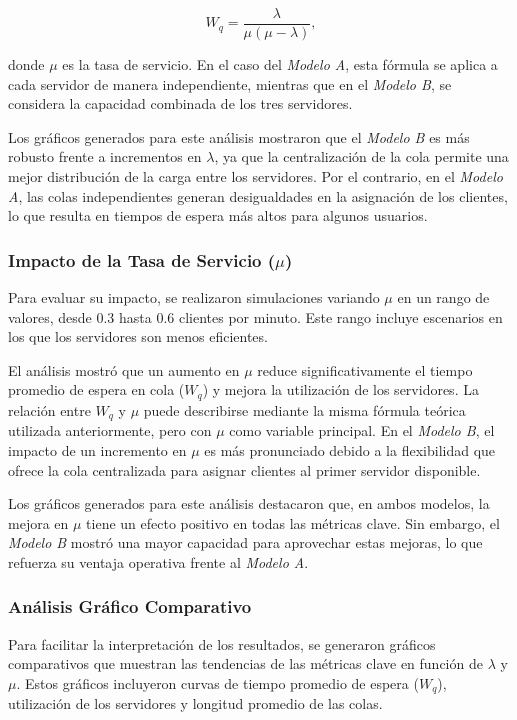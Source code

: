 \documentclass[a4paper,12pt]{article}
\begin{document}
\[\
W_q = \frac{\lambda}{\mu (\mu - \lambda)},
\]

donde \( \mu \) es la tasa de servicio. En el caso del \textit{Modelo A}, esta fórmula se aplica a cada servidor de manera independiente, mientras que en el \textit{Modelo B}, se considera la capacidad combinada de los tres servidores.

Los gráficos generados para este análisis mostraron que el \textit{Modelo B} es más robusto frente a incrementos en \( \lambda \), ya que la centralización de la cola permite una mejor distribución de la carga entre los servidores. Por el contrario, en el \textit{Modelo A}, las colas independientes generan desigualdades en la asignación de los clientes, lo que resulta en tiempos de espera más altos para algunos usuarios.

\subsubsection{Impacto de la Tasa de Servicio (\( \mu \))}
Para evaluar su impacto, se realizaron simulaciones variando \( \mu \) en un rango de valores, desde 0.3 hasta 0.6 clientes por minuto. Este rango incluye escenarios en los que los servidores son menos eficientes. 

El análisis mostró que un aumento en \( \mu \) reduce significativamente el tiempo promedio de espera en cola (\( W_q \)) y mejora la utilización de los servidores. La relación entre \( W_q \) y \( \mu \) puede describirse mediante la misma fórmula teórica utilizada anteriormente, pero con \( \mu \) como variable principal. En el \textit{Modelo B}, el impacto de un incremento en \( \mu \) es más pronunciado debido a la flexibilidad que ofrece la cola centralizada para asignar clientes al primer servidor disponible.

Los gráficos generados para este análisis destacaron que, en ambos modelos, la mejora en \( \mu \) tiene un efecto positivo en todas las métricas clave. Sin embargo, el \textit{Modelo B} mostró una mayor capacidad para aprovechar estas mejoras, lo que refuerza su ventaja operativa frente al \textit{Modelo A}.

\subsubsection{Análisis Gráfico Comparativo}

Para facilitar la interpretación de los resultados, se generaron gráficos comparativos que muestran las tendencias de las métricas clave en función de \( \lambda \) y \( \mu \). Estos gráficos incluyeron curvas de tiempo promedio de espera (\( W_q \)), utilización de los servidores y longitud promedio de las colas. 
\end{document}
